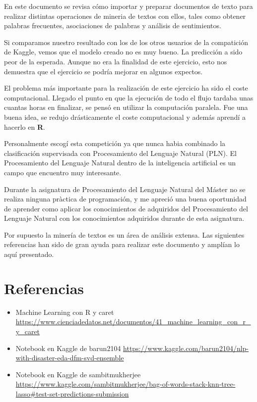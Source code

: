 \documentclass[]{article}
\begin{document}
En este documento se revisa cómo importar y preparar documentos de texto
para realizar distintas operaciones de mineria de textos con ellos,
tales como obtener palabras frecuentes, asociaciones de palabras y
análisis de sentimientos.

Si comparamos nuestro resultado con los de los otros usuarios de la
compatición de Kaggle, vemos que el modelo creado no es muy bueno. La
predicción a sido peor de la esperada. Aunque no era la finalidad de
este ejercicio, esto nos demuestra que el ejercicio se podría mejorar en
algunos expectos.

El problema más importante para la realización de este ejercicio ha sido
el coste computacional. Llegado el punto en que la ejecución de todo el
flujo tardaba unas cuantas horas en finalizar, se pensó en utilizar la
computación paralela. Fue una buena idea, se redujo drásticamente el
coste computacional y además aprendí a hacerlo en \textbf{R}.

Personalmente escogí esta competición ya que nunca habia combinado la
clasificación supervisada con Procesamiento del Lenguaje Natural (PLN).
El Procesamiento del Lenguaje Natural dentro de la inteligencia
artificial es un campo que encuentro muy interesante.

Durante la asignatura de Procesamiento del Lenguaje Natural del Máster
no se realiza ninguna pràctica de programación, y me apreció una buena
oportunidad de aprender como aplicar los conocimientos de adquiridos del
Procesamiento del Lenguaje Natural con los conocimientos adquiridos
durante de esta asignatura.

Por supuesto la minería de textos es un área de análisis extensa. Las
siguientes referencias han sido de gran ayuda para realizar este
documento y amplían lo aquí presentado.

\hypertarget{referencias}{%
\section{Referencias}\label{referencias}}

\begin{itemize}
\item
  Machine Learning con R y caret
  \url{https://www.cienciadedatos.net/documentos/41_machine_learning_con_r_y_caret}
\item
  Notebook en Kaggle de barun2104
  \url{https://www.kaggle.com/barun2104/nlp-with-disaster-eda-dfm-svd-ensemble}
\item
  Notebook en Kaggle de sambitmukherjee
  \url{https://www.kaggle.com/sambitmukherjee/bag-of-words-stack-knn-tree-lasso\#test-set-predictions-submission}
\end{itemize}
\end{document}
